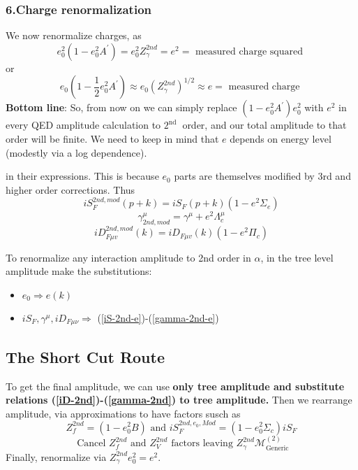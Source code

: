 \subsubsection{6.Charge renormalization}
We now renormalize charges, as
\begin{equation}e_{0}^{2}\left(1-e_{0}^{2} A^{\prime}\right)=e_{0}^{2} Z_{\gamma}^{2 n d}=e^{2}=\text { measured charge squared }\end{equation}
or
\begin{equation}e_{0}\left(1-\frac{1}{2} e_{0}^{2} A^{\prime}\right) \approx e_{0}\left(Z_{\gamma}^{2 n d}\right)^{1 / 2} \approx e=\text { measured charge }\end{equation}
\textbf{Bottom line}: So, from now on we can simply replace $\left(1-e_{0}^{2} A^{\prime}\right) e_{0}^{2}$ with $e^{2}$ in every QED amplitude calculation to $2^{\text {nd }}$ order, and our total amplitude to that order will be finite. We need to keep in mind that $e$ depends on energy level (modestly via a log dependence).

 in their expressions. This is because $e_0$ parts are themselves modified by 3rd and higher order corrections. Thus
\begin{equation}
i S_{F}^{2 n d,mod}(p+k)=i S_{F}(p+k)\left(1-e^{2} \Sigma_{e}\right)
\label{iS-2nd-e}
\end{equation}
\begin{equation}
\gamma_{2nd,mod}^{\mu}=\gamma^{\mu}+e^{2} \Lambda_{c}^{\mu}
\label{gamma-2nd-e}
\end{equation}
\begin{equation}
i D_{F \mu v}^{2 n d,mod}(k)=i D_{F \mu v}(k)\left(1-e^{2} \Pi_{c}\right)
\label{iD-2nd-e}
\end{equation}
\begin{qt}
    To renormalize any interaction amplitude to 2nd order in $\alpha$, in the tree level amplitude make the substitutions:
    \begin{itemize}
        \item $e_{0} \Rightarrow e(k)$
        \item $i S_{F}, \gamma^{\mu}, i D_{F \mu \nu} \Rightarrow$ (\ref{iS-2nd-e})-(\ref{gamma-2nd-e})
    \end{itemize}
\end{qt}
\subsection{The Short Cut Route}
To get the final amplitude, we can use \textbf{only tree amplitude and substitute relations (\ref{iD-2nd})-(\ref{gamma-2nd}) to tree amplitude.} Then we rearrange amplitude, via approximations to have factors susch as
$$Z_{f}^{2 n d}=\left(1-e_{0}^{2} B\right) \text { and } i S_{F}^{2nd,e_{0}, M o d}=\left(1-e_{0}^{2} \Sigma_{c}\right) i S_{F}$$
$$\text { Cancel } Z_{f}^{2 n d} \text { and } Z_{V}^{2 n d} \text { factors leaving } Z_{\gamma}^{2 n d} \mathcal{M}_{\text {Generic}}^{(2)}$$
Finally, renormalize via $Z_{\gamma}^{2 n d} e_{0}^{2}=e^{2}$.

